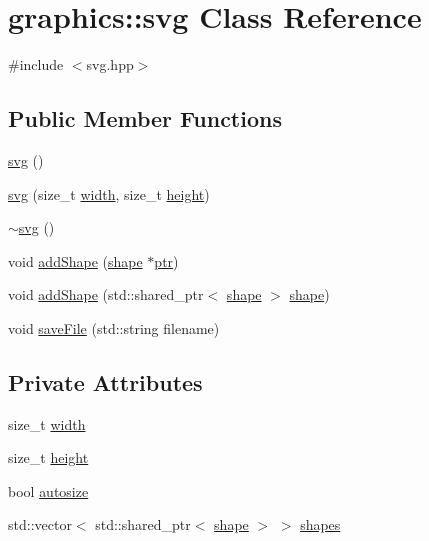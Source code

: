 \hypertarget{classgraphics_1_1svg}{}\section{graphics\+:\+:svg Class Reference}
\label{classgraphics_1_1svg}


{\ttfamily \#include $<$svg.\+hpp$>$}

\subsection*{Public Member Functions}
\begin{DoxyCompactItemize}
\item 
\hyperlink{classgraphics_1_1svg_ade9f4125871728edb5c789c476a577b7}{svg} ()
\item 
\hyperlink{classgraphics_1_1svg_ab7cb8ffe8695afbfa000107dd7895860}{svg} (size\+\_\+t \hyperlink{classgraphics_1_1svg_ad69af0bdb11e7d1871dd405673445d65}{width}, size\+\_\+t \hyperlink{classgraphics_1_1svg_ae536c6f9d7071034b9f4c3555b752815}{height})
\item 
\hyperlink{classgraphics_1_1svg_af719bb0cf02dd90b8170cbb597c9d32e}{$\sim$svg} ()
\item 
void \hyperlink{classgraphics_1_1svg_af5ca77714796299aa2a0154dd2e1b8a5}{add\+Shape} (\hyperlink{classgraphics_1_1shape}{shape} $\ast$\hyperlink{classptr}{ptr})
\item 
void \hyperlink{classgraphics_1_1svg_a9474b697ca366c21a113a63cdeea5291}{add\+Shape} (std\+::shared\+\_\+ptr$<$ \hyperlink{classgraphics_1_1shape}{shape} $>$ \hyperlink{classgraphics_1_1shape}{shape})
\item 
void \hyperlink{classgraphics_1_1svg_aa28d120647306a53ec84bde22d529ee5}{save\+File} (std\+::string filename)
\end{DoxyCompactItemize}
\subsection*{Private Attributes}
\begin{DoxyCompactItemize}
\item 
size\+\_\+t \hyperlink{classgraphics_1_1svg_ad69af0bdb11e7d1871dd405673445d65}{width}
\item 
size\+\_\+t \hyperlink{classgraphics_1_1svg_ae536c6f9d7071034b9f4c3555b752815}{height}
\item 
bool \hyperlink{classgraphics_1_1svg_aced594862a8a681a6310985ea174a60e}{autosize}
\item 
std\+::vector$<$ std\+::shared\+\_\+ptr$<$ \hyperlink{classgraphics_1_1shape}{shape} $>$ $>$ \hyperlink{classgraphics_1_1svg_a201d99b8b9e654c80a11dd0678f5d224}{shapes}
\end{DoxyCompactItemize}


